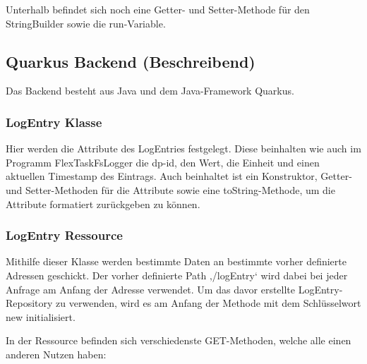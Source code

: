 Unterhalb befindet sich noch eine Getter- und Setter-Methode für den StringBuilder sowie die run-Variable.

\subsection{Quarkus Backend (Beschreibend)}
Das Backend besteht aus Java und dem Java-Framework Quarkus. 

\subsubsection{LogEntry Klasse}
Hier werden die Attribute des LogEntries festgelegt. Diese beinhalten wie auch im Programm FlexTaskFsLogger die dp-id, den Wert, die Einheit und einen aktuellen Timestamp des Eintrags. 
Auch beinhaltet ist ein Konstruktor, Getter- und Setter-Methoden für die Attribute sowie eine toString-Methode, um die Attribute formatiert zurückgeben zu können. 

\subsubsection{LogEntry Ressource}
Mithilfe dieser Klasse werden bestimmte Daten an bestimmte vorher definierte Adressen geschickt. 
Der vorher definierte Path ‚/logEntry‘ wird dabei bei jeder Anfrage am Anfang der Adresse verwendet. 
Um das davor erstellte LogEntry-Repository zu verwenden, wird es am Anfang der Methode mit dem Schlüsselwort new initialisiert.

In der Ressource befinden sich verschiedenste GET-Methoden, welche alle einen anderen Nutzen haben: 


